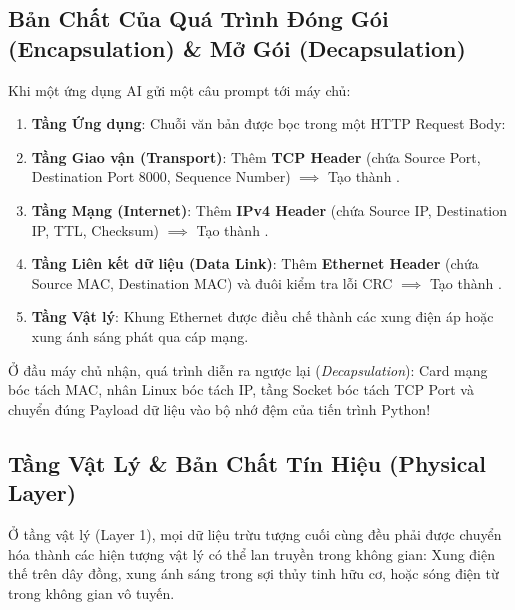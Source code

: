 \subsection{Bản Chất Của Quá Trình Đóng Gói (Encapsulation) \& Mở Gói (Decapsulation)}
Khi một ứng dụng AI gửi một câu prompt  tới máy chủ:
\begin{enumerate}
  \item \textbf{Tầng Ứng dụng}: Chuỗi văn bản được bọc trong một HTTP Request Body:
  \begin{center}
  \end{center}
  \item \textbf{Tầng Giao vận (Transport)}: Thêm \textbf{TCP Header} (chứa Source Port, Destination Port 8000, Sequence Number) $\implies$ Tạo thành .
  \item \textbf{Tầng Mạng (Internet)}: Thêm \textbf{IPv4 Header} (chứa Source IP, Destination IP, TTL, Checksum) $\implies$ Tạo thành .
  \item \textbf{Tầng Liên kết dữ liệu (Data Link)}: Thêm \textbf{Ethernet Header} (chứa Source MAC, Destination MAC) và đuôi kiểm tra lỗi CRC $\implies$ Tạo thành .
  \item \textbf{Tầng Vật lý}: Khung Ethernet được điều chế thành các xung điện áp hoặc xung ánh sáng phát qua cáp mạng.
\end{enumerate}
Ở đầu máy chủ nhận, quá trình diễn ra ngược lại (\textit{Decapsulation}): Card mạng bóc tách MAC, nhân Linux bóc tách IP, tầng Socket bóc tách TCP Port và chuyển đúng Payload dữ liệu vào bộ nhớ đệm của tiến trình Python!

\subsection{Tầng Vật Lý \& Bản Chất Tín Hiệu (Physical Layer)}
Ở tầng vật lý (Layer 1), mọi dữ liệu trừu tượng cuối cùng đều phải được chuyển hóa thành các hiện tượng vật lý có thể lan truyền trong không gian: Xung điện thế trên dây đồng, xung ánh sáng trong sợi thủy tinh hữu cơ, hoặc sóng điện từ trong không gian vô tuyến.


